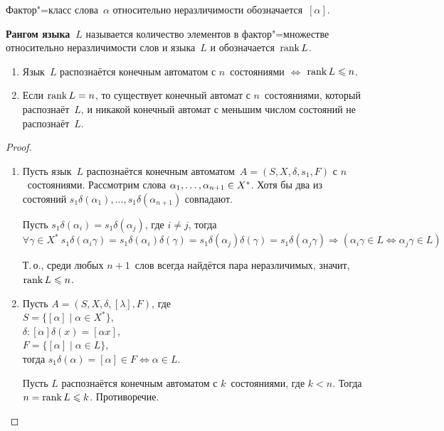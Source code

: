Фактор"=класс слова~$\alpha$ относительно неразличимости обозначается~$[\alpha]$.

\textbf{Рангом языка~$L$} называется количество элементов в фактор"=множестве относительно неразличимости слов и языка~$L$ и обозначается~$\operatorname{rank} L$.

\begin{theorem}
\begin{enumerate}
	\item Язык~$L$ распознаётся конечным автоматом с $n$~состояниями $\Leftrightarrow$ $\operatorname{rank} L \leqslant n$.
	\item Если $\operatorname{rank} L = n$, то существует конечный автомат с $n$~состояниями, который распознаёт~$L$, и никакой конечный автомат с меньшим числом состояний не распознаёт~$L$.
\end{enumerate}
\end{theorem}
\begin{proof}
\begin{enumerate}
	\item Пусть язык~$L$ распознаётся конечным автоматом~$A = (S, X, \delta, s_1, F)$ с $n$~состояниями.
	Рассмотрим слова $\alpha_1, \ldots, \alpha_{n+1} \opbr\in X^*$.
	Хотя бы два из состояний $s_1 \delta(\alpha_1), \ldots, s_1 \delta(\alpha_{n+1})$ совпадают.
	
	Пусть $s_1 \delta(\alpha_i) = s_1 \delta(\alpha_j)$, где $i \neq j$, тогда
	\begin{equation*}
	\forall \gamma \in X^* \
	s_1 \delta(\alpha_i \gamma) =
	s_1 \delta(\alpha_i) \delta(\gamma) =
	s_1 \delta(\alpha_j) \delta(\gamma) =
	s_1 \delta(\alpha_j \gamma) \Rightarrow
	(\alpha_i \gamma \in L \Leftrightarrow \alpha_j \gamma \in L)
	\end{equation*}
	
	Т.\,о., среди любых $n + 1$~слов всегда найдётся пара неразличимых, значит, $\operatorname{rank} L \leqslant n$.
	
	\item Пусть $A = (S, X, \delta, [\lambda], F)$, где\\
	$S = \{ [\alpha] \mid \alpha \in X^* \}$,\\
	$\delta \colon [\alpha] \delta(x) = [\alpha x]$,\\
	$F = \{ [\alpha] \mid \alpha \in L \}$,\\
	тогда $s_1 \delta(\alpha) = [\alpha] \in F \Leftrightarrow \alpha \in L$.
	
	Пусть $L$ распознаётся конечным автоматом с $k$~состояниями, где $k < n$.
	Тогда $n = \operatorname{rank} L \leqslant k$.
	Противоречие.
\end{enumerate}
\end{proof}

